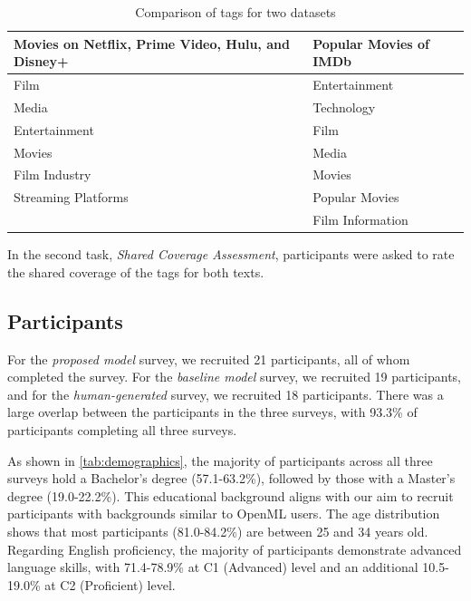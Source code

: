 \begin{table}[h]
    \centering
    \begin{tabular}{|>{\raggedright\arraybackslash}p{6cm}|>{\raggedright\arraybackslash}p{6cm}|}
        \hline
        \textbf{Movies on Netflix, Prime Video, Hulu, and Disney+} & \textbf{Popular Movies of IMDb} \\ \hline
        Film                                                       & Entertainment                   \\ \hline
        Media                                                      & Technology                      \\ \hline
        Entertainment                                              & Film                            \\ \hline
        Movies                                                     & Media                           \\ \hline
        Film Industry                                              & Movies                          \\ \hline
        Streaming Platforms                                        & Popular Movies                  \\ \hline
                                                                   & Film Information                \\ \hline
    \end{tabular}
    \caption{Comparison of tags for two datasets}
    \label{tab:tag_comparison_two_datasets}
\end{table}


In the second task, \textit{Shared Coverage Assessment}, participants were asked to rate the shared coverage of the tags for both texts.

\subsection{Participants}
For the \textit{proposed model} survey, we recruited 21 participants, all of whom completed the survey. For the \textit{baseline model} survey, we recruited 19 participants, and for the \textit{human-generated} survey, we recruited 18 participants. There was a large overlap between the participants in the three surveys, with 93.3\% of participants completing all three surveys.

As shown in \cref{tab:demographics}, the majority of participants across all three surveys hold a Bachelor's degree (57.1-63.2\%), followed by those with a Master's degree (19.0-22.2\%). This educational background aligns with our aim to recruit participants with backgrounds similar to OpenML users. The age distribution shows that most participants (81.0-84.2\%) are between 25 and 34 years old. Regarding English proficiency, the majority of participants demonstrate advanced language skills, with 71.4-78.9\% at C1 (Advanced) level and an additional 10.5-19.0\% at C2 (Proficient) level.

